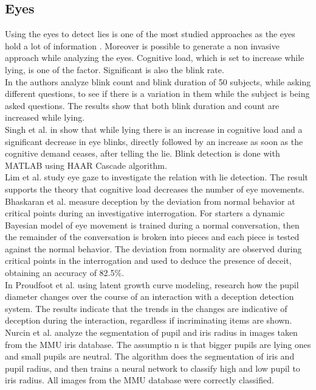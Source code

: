 \documentclass[LaM,binding=0.6cm,english,noexaminfo]{sapthesis}
\begin{document}
\subsection*{Eyes}
Using the eyes to detect lies is one of the most studied approaches as the eyes hold a lot of information \cite{FUKUDA2001239}. Moreover is possible to generate a non invasive approach while analyzing the eyes. Cognitive load, which is set to increase while lying, is one of the factor. Significant is also the blink rate.\\
In \cite{8125844} the authors analyze blink count and blink duration of 50 subjects, while asking different questions, to see if there is a variation in them while the subject is being asked questions. The results show that both blink duration and count are increased while lying.\\
Singh et al. in \cite{7324092} show that while lying there is an increase in cognitive load and a significant decrease in eye blinks, directly followed by an increase as soon as the cognitive demand ceases, after telling the lie. Blink detection is done with MATLAB using HAAR Cascade algorithm.\\
Lim et al. study eye gaze \cite{Lim:2013:LTE:2535948.2535954} to investigate the relation with lie detection. The result supports the theory that cognitive load decreases the number of eye movements.\\
Bhaskaran et al. measure deception by the deviation from normal behavior \cite{5771407} at critical points during an investigative interrogation. For starters a dynamic Bayesian model of eye movement is trained during a normal conversation, then the remainder of the conversation is broken into pieces and each piece is tested against the normal behavior. The deviation from normality are observed during critical points in the interrogation and used to deduce the presence of deceit, obtaining an accuracy of 82.5\%. \\
In \cite{7165946} Proudfoot et al. using latent growth curve modeling, research how the pupil diameter changes over the course of an interaction with a deception detection system. The results indicate that the trends in the changes are indicative of deception during the interaction, regardless if incriminating items are shown. \\
Nurcin et al. \cite{NURCIN2017417} analyze the segmentation of pupil and iris radius in images taken from the MMU iris database. The assumptio n is that bigger pupils are lying ones and small pupils are neutral. The algorithm does the segmentation of iris and pupil radius, and then trains a neural network to classify high and low pupil to iris radius. All images from the MMU database were correctly classified.
\end{document}
